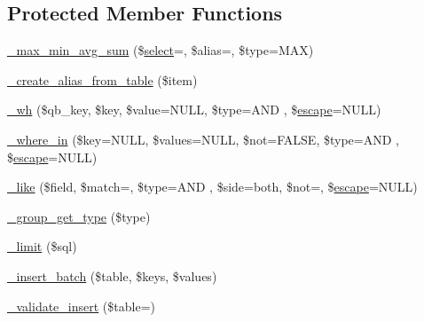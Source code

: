 \subsection*{Protected Member Functions}
\begin{DoxyCompactItemize}
\item 
\mbox{\hyperlink{class_c_i___d_b__query__builder_aea731223718d87a26bb6dc676ee4ee8c}{\+\_\+max\+\_\+min\+\_\+avg\+\_\+sum}} (\$\mbox{\hyperlink{class_c_i___d_b__query__builder_a406a7ea81e717e56496f61baf3e03f44}{select}}=\textquotesingle{}\textquotesingle{}, \$alias=\textquotesingle{}\textquotesingle{}, \$type=\textquotesingle{}M\+AX\textquotesingle{})
\item 
\mbox{\hyperlink{class_c_i___d_b__query__builder_a194edea7be9a8636b67b7d2c8a3de04e}{\+\_\+create\+\_\+alias\+\_\+from\+\_\+table}} (\$item)
\item 
\mbox{\hyperlink{class_c_i___d_b__query__builder_a616af9ae6c40b3fe7074a8517207934f}{\+\_\+wh}} (\$qb\+\_\+key, \$key, \$value=N\+U\+LL, \$type=\textquotesingle{}A\+ND \textquotesingle{}, \$\mbox{\hyperlink{class_c_i___d_b__driver_ac8f37ca5703d4558c732e692194f8cd6}{escape}}=N\+U\+LL)
\item 
\mbox{\hyperlink{class_c_i___d_b__query__builder_a768333bb814b0e99783117da4b51f097}{\+\_\+where\+\_\+in}} (\$key=N\+U\+LL, \$values=N\+U\+LL, \$not=F\+A\+L\+SE, \$type=\textquotesingle{}A\+ND \textquotesingle{}, \$\mbox{\hyperlink{class_c_i___d_b__driver_ac8f37ca5703d4558c732e692194f8cd6}{escape}}=N\+U\+LL)
\item 
\mbox{\hyperlink{class_c_i___d_b__query__builder_abe8f3477d4b15bf422fc52ba753056b5}{\+\_\+like}} (\$field, \$match=\textquotesingle{}\textquotesingle{}, \$type=\textquotesingle{}A\+ND \textquotesingle{}, \$side=\textquotesingle{}both\textquotesingle{}, \$not=\textquotesingle{}\textquotesingle{}, \$\mbox{\hyperlink{class_c_i___d_b__driver_ac8f37ca5703d4558c732e692194f8cd6}{escape}}=N\+U\+LL)
\item 
\mbox{\hyperlink{class_c_i___d_b__query__builder_a0101619da9c48cfa269730ace38a774a}{\+\_\+group\+\_\+get\+\_\+type}} (\$type)
\item 
\mbox{\hyperlink{class_c_i___d_b__query__builder_a3a02ea06541b8ecc25a33a61651562c8}{\+\_\+limit}} (\$sql)
\item 
\mbox{\hyperlink{class_c_i___d_b__query__builder_a1978e1358c812587a46e242630365099}{\+\_\+insert\+\_\+batch}} (\$table, \$keys, \$values)
\item 
\mbox{\hyperlink{class_c_i___d_b__query__builder_acbc0cb4b9bd889fa2ffc5086f65a88a1}{\+\_\+validate\+\_\+insert}} (\$table=\textquotesingle{}\textquotesingle{})

\end{DoxyCompactItemize}
